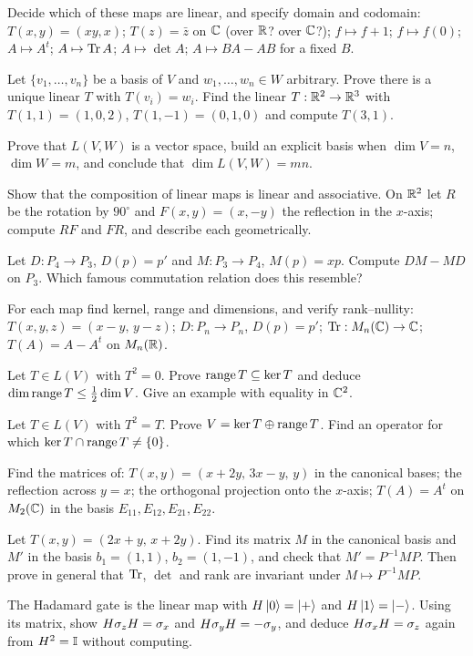 \begin{exerciseset}
   Decide which of these maps are linear, and specify domain and codomain: $T(x,y)=(xy,x)$; $T(z)=\bar z$ on $\mathbb{C}$ (over $\mathbb{R}$? over $\mathbb{C}$?); $f\mapsto f+1$; $f\mapsto f(0)$; $A\mapsto A^t$; $A\mapsto\operatorname{Tr} A$; $A\mapsto\det A$; $A\mapsto BA-AB$ for a fixed $B$.

   Let $\{v_1,\dots,v_n\}$ be a basis of $V$ and $w_1,\dots,w_n\in W$ arbitrary. Prove there is a unique linear $T$ with $T(v_i)=w_i$. Find the linear $T:\mathbb{R}^2\to\mathbb{R}^3$ with $T(1,1)=(1,0,2)$, $T(1,-1)=(0,1,0)$ and compute $T(3,1)$.

   Prove that $L(V,W)$ is a vector space, build an explicit basis when $\dim V=n$, $\dim W=m$, and conclude that $\dim L(V,W)=mn$.

   Show that the composition of linear maps is linear and associative. On $\mathbb{R}^2$ let $R$ be the rotation by $90^\circ$ and $F(x,y)=(x,-y)$ the reflection in the $x$-axis; compute $RF$ and $FR$, and describe each geometrically.

   Let $D:P_4\to P_3$, $D(p)=p'$ and $M:P_3\to P_4$, $M(p)=xp$. Compute $DM-MD$ on $P_3$. Which famous commutation relation does this resemble?

   For each map find kernel, range and dimensions, and verify rank--nullity: $T(x,y,z)=(x-y,\,y-z)$; $D:P_n\to P_n$, $D(p)=p'$; $\operatorname{Tr}:M_n(\mathbb{C})\to\mathbb{C}$; $T(A)=A-A^t$ on $M_n(\mathbb{R})$.

   Let $T\in L(V)$ with $T^2=0$. Prove $\operatorname{range} T\subseteq\operatorname{ker} T$ and deduce $\dim\operatorname{range} T\le\frac12\dim V$. Give an example with equality in $\mathbb{C}^2$.

   Let $T\in L(V)$ with $T^2=T$. Prove $V=\operatorname{ker} T\oplus\operatorname{range} T$. Find an operator for which $\operatorname{ker} T\cap\operatorname{range} T\neq\{0\}$.

   Find the matrices of: $T(x,y)=(x+2y,\,3x-y,\,y)$ in the canonical bases; the reflection across $y=x$; the orthogonal projection onto the $x$-axis; $T(A)=A^t$ on $M_2(\mathbb{C})$ in the basis $E_{11},E_{12},E_{21},E_{22}$.

   Let $T(x,y)=(2x+y,\,x+2y)$. Find its matrix $M$ in the canonical basis and $M'$ in the basis $b_1=(1,1)$, $b_2=(1,-1)$, and check that $M'=P^{-1}MP$. Then prove in general that $\operatorname{Tr}$, $\det$ and rank are invariant under $M\mapsto P^{-1}MP$.

   The Hadamard gate is the linear map with $H\left|0\right\rangle=\left|+\right\rangle$ and $H\left|1\right\rangle=\left|-\right\rangle$. Using its matrix, show $H\sigma_z H=\sigma_x$ and $H\sigma_y H=-\sigma_y$, and deduce $H\sigma_x H=\sigma_z$ again from $H^2=\mathbb{I}$ without computing.


\end{exerciseset}
